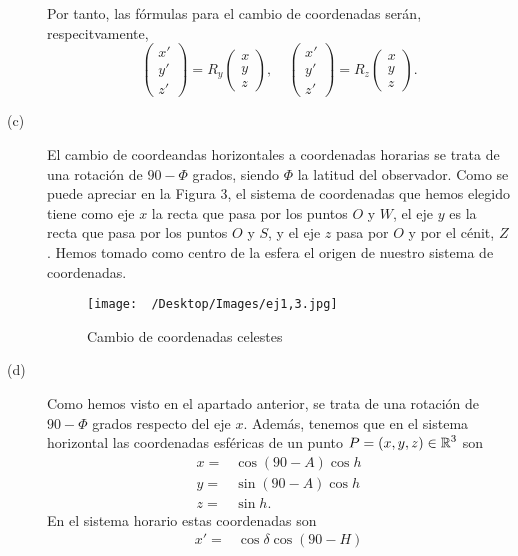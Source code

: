 \documentclass{article}
\begin{document}
\begin{sol}
\begin{description}
Por tanto, las fórmulas para el cambio de coordenadas serán, respecitvamente,
\[ \begin{pmatrix} x' \\ y' \\ z' \end{pmatrix} = R_{y}\begin{pmatrix} x \\ y \\ z \end{pmatrix}, \quad \begin{pmatrix} x' \\ y ' \\ z' \end{pmatrix} = R_{z} \begin{pmatrix} x \\ y \\ z \end{pmatrix} .\]
\item[(c)] El cambio de coordeandas horizontales a coordenadas horarias se trata de una rotación de $\displaystyle 90 - \Phi $ grados, siendo $\displaystyle \Phi $ la latitud del observador. Como se puede apreciar en la Figura 3, el sistema de coordenadas que hemos elegido tiene como eje $\displaystyle x $ la recta que pasa por los puntos $\displaystyle O $ y $\displaystyle W $, el eje $\displaystyle y $ es la recta que pasa por los puntos $\displaystyle O $ y $\displaystyle S $, y el eje $\displaystyle z $ pasa por $\displaystyle O $ y por el cénit, $\displaystyle Z $. Hemos tomado como centro de la esfera el origen de nuestro sistema de coordenadas. 
	\begin{figure}
	\centering
	\texttt{[image: ~/Desktop/Images/ej1,3.jpg]}
	\caption{Cambio de coordenadas celestes}
	\label{}
	\end{figure}
\item[(d)] Como hemos visto en el apartado anterior, se trata de una rotación de $\displaystyle 90 - \Phi $ grados respecto del eje $\displaystyle x $. Además, tenemos que en el sistema horizontal las coordenadas esféricas de un punto $\displaystyle P= \left(x,y,z\right) \in \mathbb{R}^{3} $ son
	\[
	\begin{split}
		x = & \cos \left(90 - A\right) \cos h \\
		y = & \sin\left(90-A\right) \cos h \\
		z = & \sin h.
	\end{split}
	\]
 En el sistema horario estas coordenadas son
\[
\begin{split}
	x' = & \cos \delta \cos\left(90-H\right) \\

\end{split}\]
\end{description}
\end{sol}
\end{document}

